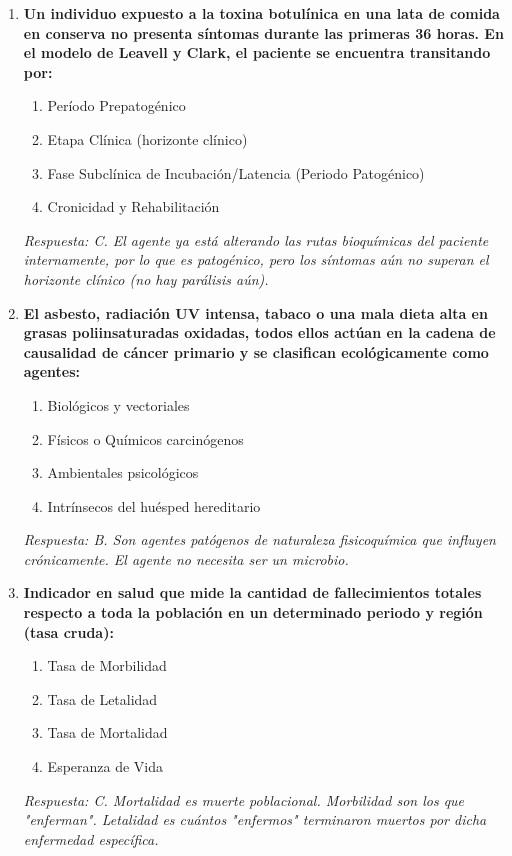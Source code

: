 \documentclass[spanish,letterpaper,oneside]{article}
\begin{document}
\begin{enumerate}[label=\textbf{\arabic*.}]
    \item \textbf{Un individuo expuesto a la toxina botulínica en una lata de comida en conserva no presenta síntomas durante las primeras 36 horas. En el modelo de Leavell y Clark, el paciente se encuentra transitando por:}
    \begin{enumerate}
        \item[A)] Período Prepatogénico
        \item[B)] Etapa Clínica (horizonte clínico)
        \item[C)] Fase Subclínica de Incubación/Latencia (Periodo Patogénico)
        \item[D)] Cronicidad y Rehabilitación
    \end{enumerate}
    \textit{Respuesta: C. El agente ya está alterando las rutas bioquímicas del paciente internamente, por lo que es patogénico, pero los síntomas aún no superan el horizonte clínico (no hay parálisis aún).}

    \item \textbf{El asbesto, radiación UV intensa, tabaco o una mala dieta alta en grasas poliinsaturadas oxidadas, todos ellos actúan en la cadena de causalidad de cáncer primario y se clasifican ecológicamente como agentes:}
    \begin{enumerate}
        \item[A)] Biológicos y vectoriales
        \item[B)] Físicos o Químicos carcinógenos
        \item[C)] Ambientales psicológicos
        \item[D)] Intrínsecos del huésped hereditario
    \end{enumerate}
    \textit{Respuesta: B. Son agentes patógenos de naturaleza fisicoquímica que influyen crónicamente. El agente no necesita ser un microbio.}

    \item \textbf{Indicador en salud que mide la cantidad de fallecimientos totales respecto a toda la población en un determinado periodo y región (tasa cruda):}
    \begin{enumerate}
        \item[A)] Tasa de Morbilidad
        \item[B)] Tasa de Letalidad
        \item[C)] Tasa de Mortalidad
        \item[D)] Esperanza de Vida
    \end{enumerate}
    \textit{Respuesta: C. Mortalidad es muerte poblacional. Morbilidad son los que "enferman". Letalidad es cuántos "enfermos" terminaron muertos por dicha enfermedad específica.}


\end{enumerate}
\end{document}
